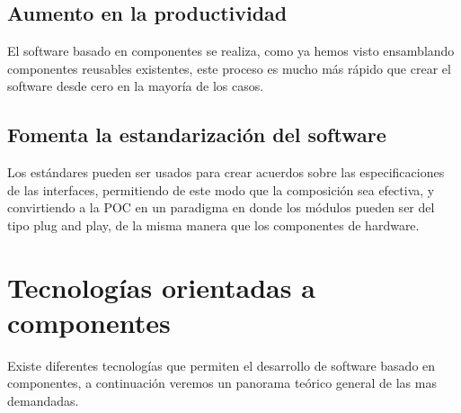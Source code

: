 \documentclass[12pt,a4paper,spanish,openany]{book}
\begin{document}
\subsection{Aumento en la productividad}
El software basado en componentes se realiza, como ya hemos visto ensamblando
componentes reusables existentes, este proceso es mucho más rápido que crear el
software desde cero en la mayoría de los casos.

\subsection{Fomenta la estandarización del software}
Los estándares pueden ser usados para crear acuerdos sobre las especificaciones
de las interfaces, permitiendo de este modo que la composición sea efectiva, y
convirtiendo a la POC en un paradigma en donde los módulos pueden ser del tipo
\gls{plug and play}, de la misma manera que los componentes de hardware.



\section{Tecnologías orientadas a componentes}

Existe diferentes tecnologías que permiten el desarrollo de software basado en
componentes, a continuación veremos un panorama teórico general de las mas
demandadas.
\end{document}
